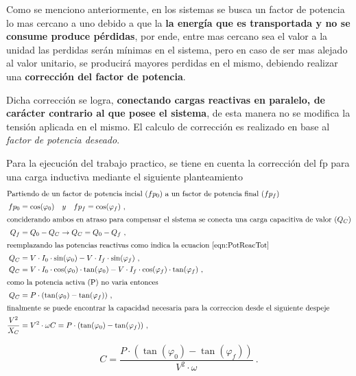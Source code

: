                Como se menciono anteriormente, en los sistemas se busca un factor de potencia 
               lo mas cercano a uno debido a que la \textbf{la energía que es transportada 
               y no se consume produce pérdidas}, por ende, entre mas cercano sea el valor a 
               la unidad las perdidas serán mínimas en el sistema, pero en caso de ser mas alejado 
               al valor unitario, se producirá mayores perdidas en el mismo, debiendo realizar
               una \textbf{corrección del factor de potencia}.

               Dicha corrección se logra, \textbf{conectando cargas reactivas en paralelo, 
               de carácter contrario al que posee el sistema}, de esta manera no se modifica 
               la tensión aplicada en el mismo. El calculo de corrección es realizado en base 
               al \textit{factor de potencia deseado}.
               
               Para la ejecución del trabajo practico, se tiene en cuenta la corrección del 
               fp para una carga inductiva mediante el siguiente planteamiento  
               \begin{align}
                  \intertext{Partiendo de un factor de potencia incial (\(fp_0\)) a un factor
                  de potencia final (\(fp_f\)) }
                  fp_0  &= \cos(\varphi_0) \hspace{10pt} y \hspace{10pt} fp_f = \cos(\varphi_f) \ , \notag \\
                  \intertext{conciderando ambos en atraso para compensar el sistema se 
                  conecta una carga capacitiva de valor (\(Q_C\))}
                  Q_f   &= Q_0 - Q_C \rightarrow Q_C = Q_0 - Q_f  \ , \notag \\
                  \intertext{reemplazando las potencias reactivas como indica la ecuacion \ref{eqn:PotReacTot}}
                  Q_C   &= V\cdot I_0\cdot \sin(\varphi_0) - V\cdot I_f\cdot \sin(\varphi_f) \ , \notag \\ 
                  Q_C   &= V\cdot I_0\cdot \cos(\varphi_0)\cdot \tan(\varphi_0)  - V\cdot I_f\cdot \cos(\varphi_f)\cdot \tan(\varphi_f) \ , \notag \\
                  \intertext{como la potencia activa (P) no varia entonces}
                  Q_C   &= P\cdot (\tan(\varphi_0) - \tan(\varphi_f)) \ , \notag \\
                  \intertext{finalmente se puede encontrar la capacidad necesaria para la correccion desde el siguiente despeje}
                  \dfrac{V^{2}}{X_C}   &= V^{2}\cdot \omega C = P\cdot (\tan(\varphi_0) - \tan(\varphi_f))  \ , \notag
               \end{align}

                  \begin{equation}
                     \boxed{C = \dfrac{P\cdot (\tan(\varphi_0) - \tan(\varphi_f))}{V^{2}\cdot \omega}} \ . \label{eqn:CorrecFp}
                  \end{equation}

      

               
               



							












